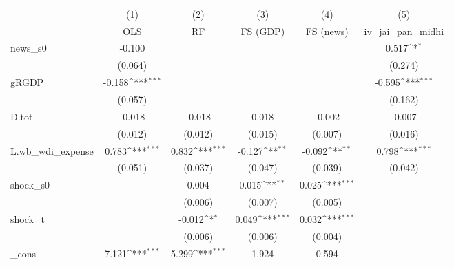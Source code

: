 {
\def\sym#1{\ifmmode^{#1}\else\(^{#1}\)\fi}
\begin{tabular}{l*{5}{c}}
\toprule
            &\multicolumn{1}{c}{(1)}&\multicolumn{1}{c}{(2)}&\multicolumn{1}{c}{(3)}&\multicolumn{1}{c}{(4)}&\multicolumn{1}{c}{(5)}\\
            &\multicolumn{1}{c}{OLS}&\multicolumn{1}{c}{RF}&\multicolumn{1}{c}{FS (GDP)}&\multicolumn{1}{c}{FS (news)}&\multicolumn{1}{c}{iv\_jai\_pan\_midhi}\\
\midrule
news\_s0     &      -0.100         &                     &                     &                     &       0.517\sym{*}  \\
            &     (0.064)         &                     &                     &                     &     (0.274)         \\
\addlinespace
gRGDP       &      -0.158\sym{***}&                     &                     &                     &      -0.595\sym{***}\\
            &     (0.057)         &                     &                     &                     &     (0.162)         \\
\addlinespace
D.tot       &      -0.018         &      -0.018         &       0.018         &      -0.002         &      -0.007         \\
            &     (0.012)         &     (0.012)         &     (0.015)         &     (0.007)         &     (0.016)         \\
\addlinespace
L.wb\_wdi\_expense&       0.783\sym{***}&       0.832\sym{***}&      -0.127\sym{**} &      -0.092\sym{**} &       0.798\sym{***}\\
            &     (0.051)         &     (0.037)         &     (0.047)         &     (0.039)         &     (0.042)         \\
\addlinespace
shock\_s0    &                     &       0.004         &       0.015\sym{**} &       0.025\sym{***}&                     \\
            &                     &     (0.006)         &     (0.007)         &     (0.005)         &                     \\
\addlinespace
shock\_t     &                     &      -0.012\sym{*}  &       0.049\sym{***}&       0.032\sym{***}&                     \\
            &                     &     (0.006)         &     (0.006)         &     (0.004)         &                     \\
\addlinespace
\_cons      &       7.121\sym{***}&       5.299\sym{***}&       1.924         &       0.594         &                     \\

\end{tabular}}
